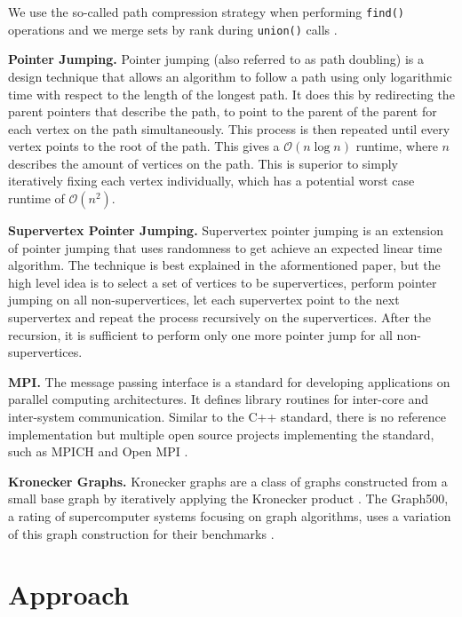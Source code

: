 \documentclass[letterpaper]{article}
\newcommand{\bigoh}{\mathcal O}
\newcommand{\mypar}[1]{{\bf #1.}}
\begin{document}
We use the so-called path compression strategy when performing \verb|find()| operations and we merge sets by rank during
\verb|union()| calls \cite{intro_to_algos}.

\mypar{Pointer Jumping}
Pointer jumping \cite{jeje1992introduction} (also referred to as path doubling) is a design technique that allows an
algorithm to follow a path using only logarithmic time with respect to the length of the longest path. It does this by
redirecting the parent pointers that describe the path, to point to the parent of the parent for each vertex on the path
simultaneously. This process is then repeated until every vertex points to the root of the path. This gives a $\bigoh(n
\log n)$ runtime, where $n$ describes the amount of vertices on the path. This is superior to simply iteratively fixing
each vertex individually, which has a potential worst case runtime of $\bigoh(n^2)$.

\mypar{Supervertex Pointer Jumping}
Supervertex pointer jumping \cite{chung1996parallel} is an extension of pointer jumping that uses randomness to get
achieve an expected linear time algorithm. The technique is best explained in the aformentioned paper, but the high
level idea is to select a set of vertices to be supervertices, perform pointer jumping on all non-supervertices, let each
supervertex point to the next supervertex and repeat the process recursively on the supervertices. After the recursion,
it is sufficient to perform only one more pointer jump for all non-supervertices.

\mypar{MPI}
The message passing interface \cite{clarke1994mpi} is a standard for developing applications on parallel computing
architectures. It defines library routines for inter-core and inter-system communication. Similar to the
C++ standard, there is no reference implementation but multiple open source projects implementing the standard, such as
MPICH and Open MPI \cite{gabriel2004open}.

\mypar{Kronecker Graphs}
Kronecker graphs are a class of graphs constructed from a small base graph by iteratively applying the Kronecker product
\cite{leskovec2010kronecker}. The Graph500, a rating of supercomputer systems focusing on graph algorithms, uses a
variation of this graph construction for their benchmarks \cite{graph500}.

\section{Approach}
\label{sec:approach}
\end{document}
